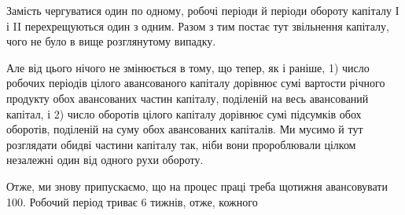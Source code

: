 Замість чергуватися один по одному, робочі періоди й періоди обороту
капіталу І і II перехрещуються один з одним. Разом з тим постає
тут звільнення капіталу, чого не було в вище розглянутому випадку.

Але від цього нічого не змінюється в тому, що тепер, як і раніше,
1) число робочих періодів цілого авансованого капіталу дорівнює сумі
вартости річного продукту обох авансованих частин капіталу, поділеній
на весь авансований капітал, і 2) число оборотів цілого капіталу дорівнює
сумі підсумків обох оборотів, поділеній на суму обох авансованих
капіталів. Ми мусимо й тут розглядати обидві частини капіталу так, ніби
вони пророблювали цілком незалежні один від одного рухи обороту.

Отже, ми знову припускаємо, що на процес праці треба щотижня
авансовувати 100. Робочий період триває 6 тижнів, отже, кожного
\parbreak{}  %
